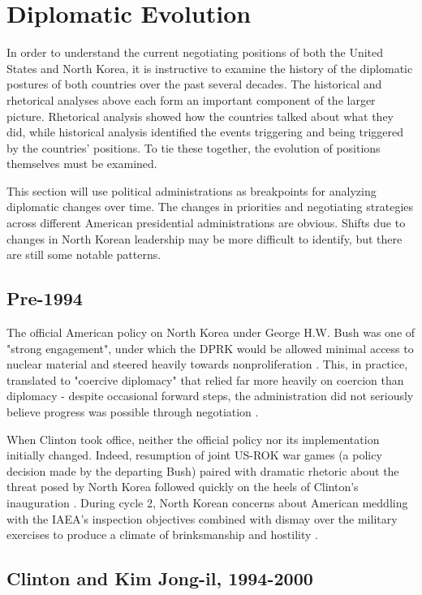 \documentclass{article}
\begin{document}
\section{Diplomatic Evolution}

In order to understand the current negotiating positions of both the United States and North Korea, it is instructive to examine the history of the diplomatic postures of both countries over the past several decades. The historical and rhetorical analyses above each form an important component of the larger picture. Rhetorical analysis showed how the countries talked about what they did, while historical analysis identified the events triggering and being triggered by the countries' positions. To tie these together, the evolution of positions themselves must be examined.

This section will use political administrations as breakpoints for analyzing diplomatic changes over time. The changes in priorities and negotiating strategies across different American presidential administrations are obvious. Shifts due to changes in North Korean leadership may be more difficult to identify, but there are still some notable patterns.

\subsection{Pre-1994}

The official American policy on North Korea under George H.W. Bush was one of "strong engagement", under which the DPRK would be allowed minimal access to nuclear material and steered heavily towards nonproliferation \cite{cerami}. This, in practice, translated to "coercive diplomacy" that relied far more heavily on coercion than diplomacy - despite occasional forward steps, the administration did not seriously believe progress was possible through negotiation \cite{sigal}.

When Clinton took office, neither the official policy nor its implementation initially changed. Indeed, resumption of joint US-ROK war games (a policy decision made by the departing Bush) paired with dramatic rhetoric about the threat posed by North Korea followed quickly on the heels of Clinton's inauguration \cite{cumings}. During cycle 2, North Korean concerns about American meddling with the IAEA's inspection objectives combined with dismay over the military exercises to produce a climate of brinksmanship and hostility \cite{cumings}.

\subsection{Clinton and Kim Jong-il, 1994-2000}
\end{document}
